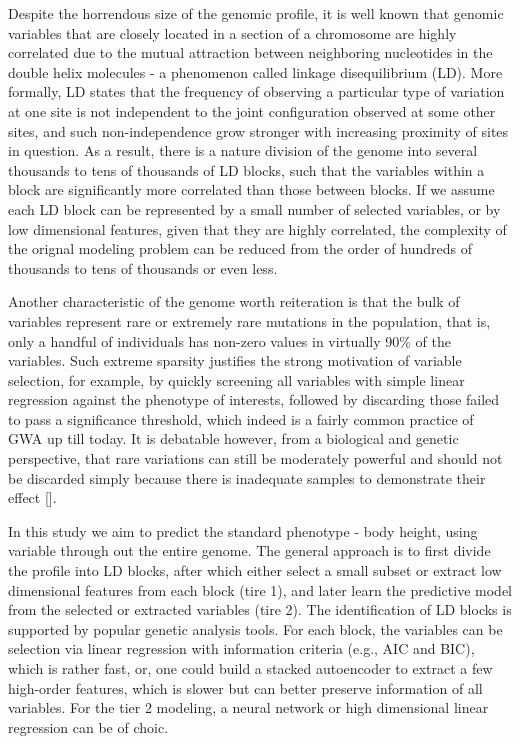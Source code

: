 \documentclass[acmtog, authorversion]{acmart}
\begin{document}
Despite the horrendous size of the genomic profile, it is well known that genomic variables that are closely located in a section of a chromosome are highly correlated due to the mutual attraction between neighboring nucleotides in the double helix molecules - a phenomenon called linkage disequilibrium (LD). More formally, LD states that the frequency of observing a particular type of variation at one site is not independent to the joint configuration observed at some other sites, and such non-independence grow stronger with increasing proximity of sites in question. As a result, there is a nature division of the genome into several thousands to tens of thousands of LD blocks, such that the variables within a block are significantly more correlated than those between blocks. If we assume each LD block can be represented by a small number of selected variables, or by low dimensional features, given that they are highly correlated, the complexity of the orignal modeling problem can be reduced from the order of hundreds of thousands to tens of thousands or even less.

Another characteristic of the genome worth reiteration is that the bulk of variables represent rare or extremely rare mutations in the population, that is, only a handful of individuals has non-zero values in virtually 90\% of the variables. Such extreme sparsity justifies the strong motivation of variable selection, for example, by quickly screening all variables with simple linear regression against the phenotype of interests, followed by discarding those failed to pass a significance threshold, which indeed is a fairly common practice of GWA up till today. It is debatable however, from a biological and genetic perspective, that rare variations can still be moderately powerful and should not be discarded simply because there is inadequate samples to demonstrate their effect [].

In this study we aim to predict the standard phenotype - body height, using variable through out the entire genome. The general approach is to first divide the profile into LD blocks, after which either select a small subset or extract low dimensional features from each block (tire 1), and later learn the predictive model from the selected or extracted variables (tire 2). The identification of LD blocks is supported by popular genetic analysis tools. For each block, the variables can be selection via linear regression with information criteria (e.g., AIC and BIC), which is rather fast, or, one could build a stacked autoencoder to extract a few high-order features, which is slower but can better preserve information of all variables. For the tier 2 modeling, a neural network or high dimensional linear regression can be of choic.
\end{document}
